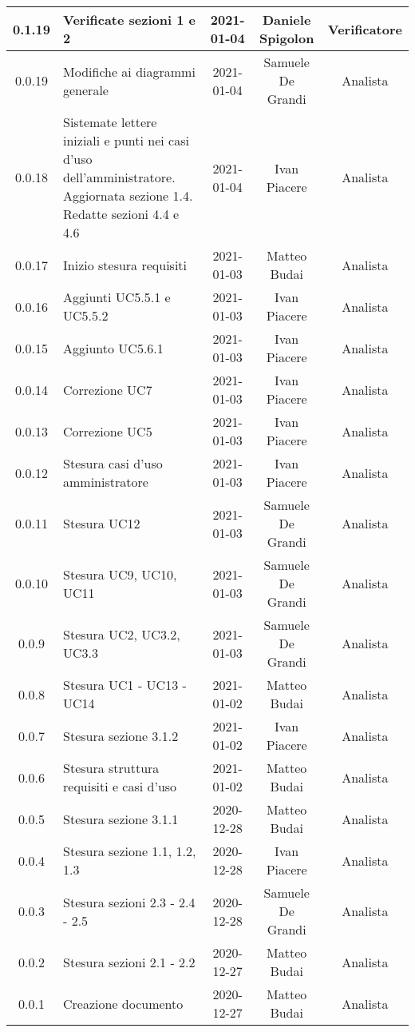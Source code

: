 \begin{center}
\begin{longtable}{|c|p{5cm}|c|c|c|}
		\hline
		0.1.19 & Verificate sezioni 1 e 2 & 2021-01-04 & Daniele Spigolon & Verificatore \\
		\hline
		0.0.19 & Modifiche ai diagrammi generale  & 2021-01-04 & Samuele De Grandi & Analista \\
		\hline
		0.0.18 & Sistemate lettere iniziali e punti nei casi d'uso dell'amministratore. Aggiornata sezione 1.4. Redatte sezioni 4.4 e 4.6 & 2021-01-04 & Ivan Piacere & Analista \\
		\hline
		0.0.17 & Inizio stesura requisiti & 2021-01-03 & Matteo Budai & Analista \\
		\hline
		0.0.16 & Aggiunti UC5.5.1 e UC5.5.2 & 2021-01-03 & Ivan Piacere & Analista \\
		\hline
		0.0.15 & Aggiunto UC5.6.1 & 2021-01-03 & Ivan Piacere & Analista \\
		\hline
		0.0.14 & Correzione UC7 & 2021-01-03 & Ivan Piacere & Analista \\
		\hline
		0.0.13 & Correzione UC5 & 2021-01-03 & Ivan Piacere & Analista \\
		\hline
		0.0.12 & Stesura casi d'uso amministratore & 2021-01-03 & Ivan Piacere & Analista \\
		\hline
		0.0.11 & Stesura UC12  & 2021-01-03 & Samuele De Grandi & Analista \\
		\hline
	    0.0.10 & Stesura UC9, UC10, UC11  & 2021-01-03 & Samuele De Grandi & Analista \\
		\hline
		0.0.9 & Stesura UC2, UC3.2, UC3.3  & 2021-01-03 & Samuele De Grandi & Analista \\
		\hline
		0.0.8 & Stesura UC1 - UC13 - UC14 & 2021-01-02 & Matteo Budai & Analista \\
		\hline
		0.0.7 & Stesura sezione 3.1.2 & 2021-01-02 & Ivan Piacere & Analista\\
		\hline
		0.0.6 & Stesura struttura requisiti e casi d'uso & 2021-01-02 & Matteo Budai & Analista \\
		\hline
		0.0.5 & Stesura sezione 3.1.1 & 2020-12-28 & Matteo Budai & Analista \\
		\hline
		0.0.4 & Stesura sezione 1.1, 1.2, 1.3 & 2020-12-28 & Ivan Piacere & Analista \\
		\hline
		0.0.3 & Stesura sezioni 2.3 - 2.4 - 2.5 & 2020-12-28 & Samuele De Grandi & Analista \\
		\hline
		0.0.2 & Stesura sezioni 2.1 - 2.2 & 2020-12-27 & Matteo Budai & Analista \\
		\hline
		0.0.1 & Creazione documento & 2020-12-27 & Matteo Budai & Analista \\
		\hline
		
	\end{longtable}
\end{center}
